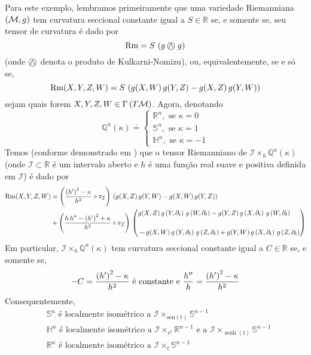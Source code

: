 \begin{exem}\label{FormaEspacialComoWarped}
Para este exemplo, lembramos primeiramente que uma variedade Riemanniana $\left( \mathcal{M}, g  \right)$ tem curvatura seccional constante igual a $S \in \mathbb{R}$ se, e somente se, seu tensor de curvatura é dado por
\[
\mathrm{Rm} = S \, \left( g \mathbin{\bigcirc\mspace{-15mu}\wedge\mspace{4mu}} g \right)
\]
(onde $\mathbin{\bigcirc\mspace{-15mu}\wedge\mspace{4mu}}$ denota o produto de Kulkarni-Nomizu), ou, equivalentemente, se e só se,
\[
 \mathrm{Rm}(X, Y, Z, W)=  S \, \left(  g(X, W) \, g(Y, Z)  - g(X, Z) \, g(Y, W)  \right)
 \]
sejam quais forem $X, Y, Z, W \in \Gamma\left( T \mathcal{M} \right)$. Agora, denotando
\[
\mathbb{Q}^n(\kappa) \doteq \begin{cases}
\mathbb{R}^n, \text{ se } \kappa = 0 \\
\mathbb{S}^n, \text{ se } \kappa = 1 \\
\mathbb{H}^n, \text{ se } \kappa = -1 
\end{cases}
\]
Temos (conforme demonstrado em ) que o tensor Riemanniano de $\mathcal{I} \times_{h} \mathbb{Q}^n(\kappa)$ (onde $\mathcal{I} \subset \mathbb{R}$ é um intervalo aberto e $h$ é uma função real suave e positiva definida em $\mathcal{I}$) é dado por 
\[ \begin{aligned}
\mathrm{Rm}(X, Y, Z, W) &= \left(  \frac{\left( h' \right)^2 - \kappa}{h^2} \circ \pi_{\mathcal{I}} \right) \, \left(  g(X, Z) \, g(Y, W) - g(X, W) \, g(Y, Z) \right) \\
&+ \left( \frac{h \, h'' - \left( h' \right)^2 + \kappa}{h^2}  \circ \pi_{\mathcal{I}} \right) \, \begin{split}\hspace{0cm}
    \left(
    \begin{aligned}
          &g(X, Z) \, g\left( Y, \partial_t \right) \, g\left( W, \partial_t \right) - g(Y, Z) \, g\left( X, \partial_t \right) \,  g\left( W, \partial_t \right) \\[0.5cm]
         &-g(X, W) \, g\left( Y, \partial_t \right) \, g\left( Z, \partial_t \right) + g(Y, W) \, g\left( X, \partial_t \right) \, g\left( Z, \partial_t \right)
    \end{aligned}
    \right) 
\end{split}
\end{aligned}
\]
Em particular, $\mathcal{I} \times_{h} \mathbb{Q}^n(\kappa)$ tem curvatura seccional constante igual a $C \in \mathbb{R}$ se, e somente se, 
\[
-C = \frac{\left( h' \right)^2 - \kappa}{h^2}  \text{ é constante e } \frac{h''}{h} = \frac{\left( h' \right)^2 - \kappa}{h^2}
\]
Consequentemente, 
\begin{align*}
&\text{$\mathbb{S}^n$ é localmente isométrico a $\mathcal{I} \times_{\operatorname{sen(t)}} \mathbb{S}^{n-1}$} \\
&\text{$\mathbb{H}^n$ é localmente isométrico a $\mathcal{I} \times_{e^{t}} \mathbb{R}^{n-1}$ e a  $\mathcal{I} \times_{\operatorname{senh}(t)} \mathbb{S}^{n-1}$} \\
&\text{$\mathbb{R}^n$ é localmente isométrico a $\mathcal{I} \times_{t} \mathbb{S}^{n-1}$}
\end{align*}
\end{exem}


